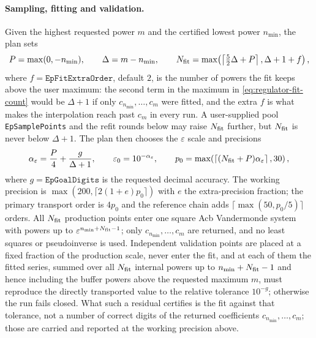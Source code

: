 \documentclass[11pt,a4paper]{article}
\begin{document}
\paragraph{Sampling, fitting and validation.}
Given the highest requested power $m$ and the certified lowest power $n_{\min}$, the plan sets
\begin{equation}
  P=\max(0,-n_{\min}),\qquad
  \Delta=m-n_{\min},\qquad
  N_{\rm fit}=\max\!\left(\left\lceil\tfrac52\Delta+P\right\rceil,\Delta+1+f\right),
  \label{eq:regulator-fit-count}
\end{equation}
where $f=\texttt{EpFitExtraOrder}$, default $2$, is the number of powers the fit keeps above the
user maximum: the second term in the maximum in \eqref{eq:regulator-fit-count} would be $\Delta+1$ if
only $c_{n_{\min}},\ldots,c_m$ were fitted, and the extra $f$ is what makes the interpolation reach
past $c_m$ in every run. A user-supplied pool \texttt{EpSamplePoints} and the refit rounds below may
raise $N_{\rm fit}$ further, but $N_{\rm fit}$ is never below $\Delta+1$.
The plan then chooses the $\varepsilon$ scale and precisions
\begin{equation}
  \alpha_\varepsilon=\frac{P}{4}+\frac{g}{\Delta+1},\qquad
  \varepsilon_0=10^{-\alpha_\varepsilon},\qquad
  p_0=\max\!\left(\left\lceil(N_{\rm fit}+P)\alpha_\varepsilon\right\rceil,30\right),
  \label{eq:regulator-scale-precision}
\end{equation}
where $g=\texttt{EpGoalDigits}$ is the requested decimal accuracy. The working precision is
$\max(200,\lceil2(1+e)p_0\rceil)$ with $e$ the extra-precision fraction; the primary
transport order is $4p_0$ and the reference chain adds
$\lceil\max(50,p_0/5)\rceil$ orders. All $N_{\rm fit}$ production points enter one square
Acb Vandermonde system with powers up to $\varepsilon^{n_{\min}+N_{\rm fit}-1}$; only
$c_{n_{\min}},\ldots,c_m$ are returned, and no least squares or pseudoinverse is used.
Independent validation points are placed at a fixed fraction of the production scale, never
enter the fit, and at each of them the fitted series, summed over all $N_{\rm fit}$ internal powers up
to $n_{\min}+N_{\rm fit}-1$ and hence including the buffer powers above the requested maximum $m$, must
reproduce the directly transported value to the relative tolerance $10^{-g}$; otherwise
the run fails closed. What such a residual certifies is the fit against that tolerance, not a number of
correct digits of the returned coefficients $c_{n_{\min}},\ldots,c_m$; those are carried and reported at
the working precision above.
\end{document}
